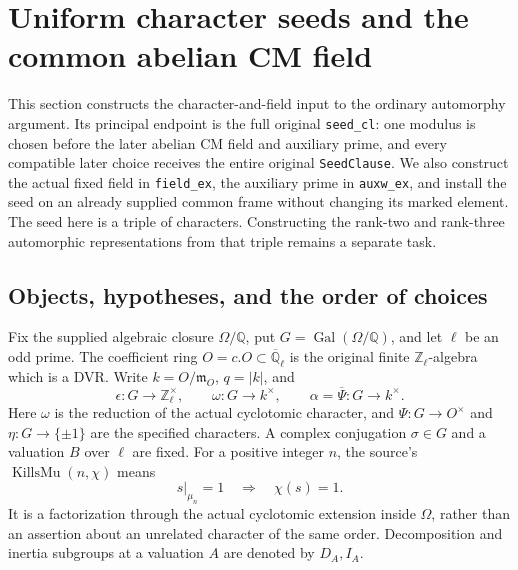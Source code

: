 \section{Uniform character seeds and the common abelian CM field}
\label{sec:common-arithmetic-frame-v50}

This section constructs the character-and-field input to the ordinary
automorphy argument.  Its principal endpoint is the full original
\texttt{seed\_cl}: one modulus is chosen before the later abelian CM
field and auxiliary prime, and every compatible later choice receives
the entire original \texttt{SeedClause}.  We also construct the actual
fixed field in \texttt{field\_ex}, the auxiliary prime in
\texttt{auxw\_ex}, and install the seed on an already supplied common
frame without changing its marked element.  The seed here is a triple
of characters.  Constructing the rank-two and rank-three automorphic
representations from that triple remains a separate task.

\subsection{Objects, hypotheses, and the order of choices}

Fix the supplied algebraic closure \(\Omega/\mathbb Q\), put
\(G=\operatorname{Gal}(\Omega/\mathbb Q)\), and let \(\ell\) be an
odd prime.  The coefficient ring \(O=c.O\subset\overline{\mathbb Q}_\ell\)
is the original finite \(\mathbb Z_\ell\)-algebra which is a DVR.
Write \(k=O/\mathfrak m_O\), \(q=|k|\), and
\[
 \epsilon:G\longrightarrow\mathbb Z_\ell^\times,\qquad
 \omega:G\longrightarrow k^\times,
 \qquad \alpha=\overline\Psi:G\longrightarrow k^\times .
 \tag{CAF.1}
\]
Here \(\omega\) is the reduction of the actual cyclotomic character,
and \(\Psi:G\to O^\times\) and
\(\eta:G\to\{\pm1\}\) are the specified characters.  A complex
conjugation \(\sigma\in G\) and a valuation \(B\) over \(\ell\)
are fixed.  For a positive integer \(n\), the source's
\(\operatorname{KillsMu}(n,\chi)\) means
\[
 s|_{\mu_n}=1\quad\Longrightarrow\quad \chi(s)=1.
 \tag{CAF.2}
\]
It is a factorization through the actual cyclotomic extension inside
\(\Omega\), rather than an assertion about an unrelated character of
the same order.  Decomposition and inertia subgroups at a valuation
\(A\) are denoted by \(D_A,I_A\).

